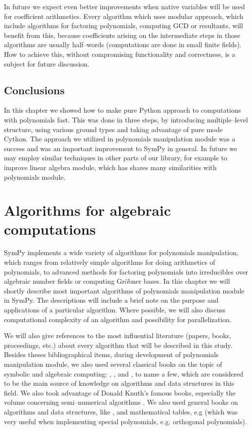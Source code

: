 In future we expect even better improvements when native variables will be used for coefficient
arithmetics. Every algorithm which uses modular approach, which include algorithms for factoring
polynomials, computing GCD or resultants, will benefit from this, because coefficients arising
on the intermediate steps in those algorithms are usually half--words (computations are done in
small finite fields). How to achieve this, without compromising functionality and correctness,
is a subject for future discussion.


\section{Conclusions}

In this chapter we showed how to make pure Python approach to computations with polynomials fast.
This was done in three steps, by introducing multiple--level structure, using various ground types
and taking advantage of pure mode Cython. The approach we utilized in polynomials manipulation module
was a success and was an important improvement to SymPy in general. In future we may employ similar
techniques in other parts of our library, for example to improve linear algebra module, which has
shares many similarities with polynomials module.



\chapter{Algorithms for algebraic computations}\label{thesis-algorithms}

SymPy implements a wide variety of algorithms for polynomials manipulation, which ranges from
relatively simple algorithms for doing arithmetics of polynomials, to advanced methods for
factoring polynomials into irreducibles over algebraic number fields or computing Gröbner
bases. In this chapter we will shortly describe most important algorithms of polynomials
manipulation module in SymPy. The descriptions will include a brief note on the purpose and
applications of a particular algorithm. Where possible, we will also discuss computational
complexity of an algorithm and possibility for parallelization.

We will also give references to the most influential literature (papers, books, proceedings, etc.)
about every algorithm that will be described in this study. Besides theses bibliographical items,
during development of polynomials manipulation module, we also used several classical books on the
topic of symbolic and algebraic computing: \cite{Davenport1988systems}, \cite{Geddes1992algorithms},
\cite{Gathen1999modern} and \cite{Grabmeier2003algebra}, to name a few, which are considered to be the
main source of knowledge on algorithms and data structures in this field. We also took advantage
of Donald Knuth's famous books, especially the volume concerning semi--numerical algorithms
\cite{Knuth1985seminumerical}. We also used general books on algorithms and data structures, like
\cite{Cormen2001algorithms}, and mathematical tables, e.g \cite{Abramowitz1964handbook} (which was very
useful when implementing special polynomials, e.g. orthogonal polynomials).


